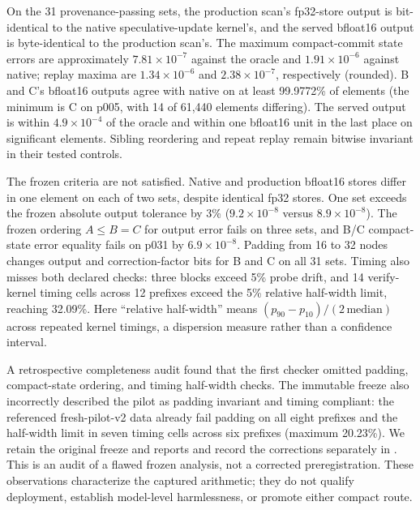 \documentclass[conference]{IEEEtran}
\begin{document}
On the 31 provenance-passing sets, the production scan's fp32-store output is bit-identical to the native speculative-update kernel's, and the served bfloat16 output is byte-identical to the production scan's. The maximum compact-commit state errors are approximately $7.81\times10^{-7}$ against the oracle and $1.91\times10^{-6}$ against native; replay maxima are $1.34\times10^{-6}$ and $2.38\times10^{-7}$, respectively (rounded). B and C's bfloat16 outputs agree with native on at least 99.9772\% of elements (the minimum is C on p005, with 14 of 61,440 elements differing). The served output is within $4.9\times10^{-4}$ of the oracle and within one bfloat16 unit in the last place on significant elements. Sibling reordering and repeat replay remain bitwise invariant in their tested controls.

The frozen criteria are not satisfied. Native and production bfloat16 stores differ in one element on each of two sets, despite identical fp32 stores. One set exceeds the frozen absolute output tolerance by 3\% ($9.2\times10^{-8}$ versus $8.9\times10^{-8}$). The frozen ordering $A\le B=C$ for output error fails on three sets, and B/C compact-state error equality fails on p031 by $6.9\times10^{-8}$. Padding from 16 to 32 nodes changes output and correction-factor bits for B and C on all 31 sets. Timing also misses both declared checks: three blocks exceed 5\% probe drift, and 14 verify-kernel timing cells across 12 prefixes exceed the 5\% relative half-width limit, reaching 32.09\%. Here ``relative half-width'' means $(p_{90}-p_{10})/(2\,\mathrm{median})$ across repeated kernel timings, a dispersion measure rather than a confidence interval.

A retrospective completeness audit found that the first checker omitted padding, compact-state ordering, and timing half-width checks. The immutable freeze also incorrectly described the pilot as padding invariant and timing compliant: the referenced fresh-pilot-v2 data already fail padding on all eight prefixes and the half-width limit in seven timing cells across six prefixes (maximum 20.23\%). We retain the original freeze and reports and record the corrections separately in . This is an audit of a flawed frozen analysis, not a corrected preregistration. These observations characterize the captured arithmetic; they do not qualify deployment, establish model-level harmlessness, or promote either compact route.
\end{document}
